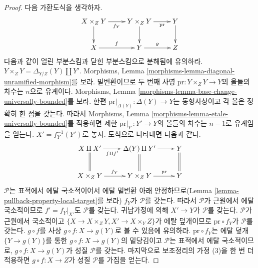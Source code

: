 \begin{proof}
\medskip\noindent
다음 가환도식을 생각하자.
$$
\xymatrix{
X \times_Z Y \ar[d] \ar[r]_{f_Y} &
Y \times_Z Y \ar[d] \ar[r]_-{\text{pr}} &
Y \ar[d] \\
X \ar[r]^f &
Y \ar[r]^g &
Z
}
$$
다음과 같이 열린 부분스킴과 닫힌 부분스킴으로 분해됨에 유의하라.
$Y \times_Z Y = \Delta_{Y/Z}(Y) \amalg Y'$.
Morphisms, Lemma \ref{morphisms-lemma-diagonal-unramified-morphism}를
보라. 밑변환이므로 두 번째 사영
$\text{pr} : Y \times_Z Y \to Y$의 올들의 차수는 $n$으로 유계이다.
Morphisms, Lemma \ref{morphisms-lemma-base-change-universally-bounded}를
보라. 한편 $\text{pr}|_{\Delta(Y)} : \Delta(Y) \to Y$는 동형사상이고
각 올은 정확히 한 점을 갖는다. 따라서 Morphisms, Lemma
\ref{morphisms-lemma-etale-universally-bounded}를 적용하면 제한
$\text{pr}|_{Y'} : Y' \to Y$의 올들의 차수는 $n - 1$로 유계임을
얻는다. $X' = f_Y^{-1}(Y')$로 놓자. 도식으로 나타내면 다음과 같다.
$$
\xymatrix{
X \amalg X' \ar@{=}[d] \ar[r]_-{f \amalg f'} &
\Delta(Y) \amalg Y' \ar@{=}[d] \ar[r] &
Y \ar@{=}[d] \\
X \times_Z Y \ar[r]^{f_Y} &
Y \times_Z Y \ar[r]^-{\text{pr}} &
Y
}
$$
$\mathcal{P}$는 표적에서 에탈 국소적이어서 에탈 밑변환 아래
안정하므로(Lemma \ref{lemma-pullback-property-local-target}를 보라)
$f_Y$가 $\mathcal{P}$를 갖는다. 따라서 $\mathcal{P}$가 근원에서
에탈 국소적이므로 $f' = f_Y|_{X'}$도 $\mathcal{P}$를 갖는다.
귀납가정에 의해 $X' \to Y$가 $\mathcal{P}$를 갖는다.
$\mathcal{P}$가 근원에서 국소적이고
$\{X \to X \times_Z Y, X' \to X \times_Y Z\}$가 에탈 덮개이므로
$\text{pr} \circ f_Y$가 $\mathcal{P}$를 갖는다. $g \circ f$를 사상
$g \circ f : X \to g(Y)$로 볼 수 있음에 유의하라.
$\text{pr} \circ f_Y$는 에탈 덮개 $\{Y \to g(Y)\}$를 통한
$g \circ f : X \to g(Y)$의 밑당김이고 $\mathcal{P}$는 표적에서 에탈
국소적이므로, $g \circ f : X \to g(Y)$가 성질 $\mathcal{P}$를 갖는다.
마지막으로 보조정리의 가정 (3)을 한 번 더 적용하면
$g \circ f : X \to Z$가 성질 $\mathcal{P}$를 가짐을 얻는다.
\end{proof}

